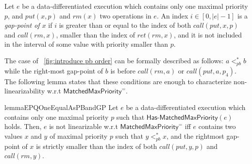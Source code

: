 \begin{definition}\label{def:gap-point for matched put and rm operations}
Let $e$ be a data-differentiated execution which contains only one maximal priority $p$, and $\textit{put}(x,p)$ and $\textit{rm}(x)$ two operations in $e$. An index $i\in [0,|e|-1]$ is a \emph{gap-point of $x$} if $i$ is greater than or equal to the index of both $\textit{call}(\textit{put},x,p)$ and $\textit{call}(\textit{rm},x)$, smaller than the index of $\textit{ret}(\textit{rm},x)$, and it is not included in the interval of some value with priority smaller than $p$.
\end{definition}

The case of \figurename~\ref{fig:introduce pb order} can be formally described as follows: $a <_{\textit{pb}}^* b$ while the right-most gap-point of $b$ is before $\textit{call}(\textit{rm},a)$ or $\textit{call}(\textit{put},a,p_4)$. The following lemma states that these conditions are enough to characterize non-linearizability w.r.t $\mathsf{MatchedMaxPriority}^{=}$.

\begin{restatable}{lemma}{EPQOneEqualAsPBandGP}
\label{lemma:EPQ1Equal as pb order and gap-point}
Let $e$ be a data-differentiated execution which contains only one maximal priority $p$ such that $\mathsf{Has\text{-}MatchedMaxPriority}(e)$ holds.
Then, $e$ is not linearizable w.r.t $\mathsf{MatchedMaxPriority}^{=}$ iff $e$ contains two values $x$ and $y$ of maximal priority $p$ such that $y <_{\textit{pb}}^* x$, and the rightmost gap-point of $x$ is strictly smaller than the index of both $\textit{call}(\textit{put},y,p)$ and $\textit{call}(\textit{rm},y)$.
\end{restatable}

